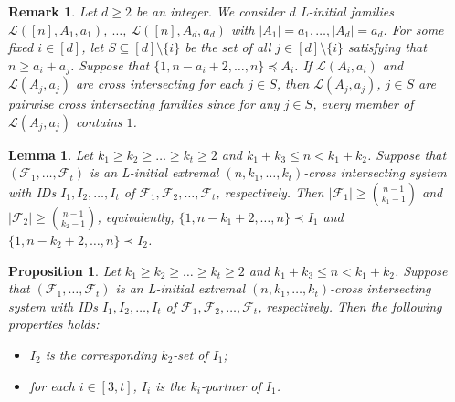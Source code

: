 \documentclass[10pt,a4paper]{amsart}
\newtheorem{proposition}{Proposition}
\newtheorem{remark}{Remark}
\newtheorem{lemma}{Lemma}
\begin{document}
\begin{remark}\label{remark2.20+}
Let $d\geq 2$ be an integer. We consider $d$ L-initial families $\mathcal{L}([n], A_1, a_1)$, $\dots$, $\mathcal{L}([n], A_d, a_d)$ with $|A_1|=a_1, \dots, |A_d|=a_d$. For some fixed $i\in [d]$, let $S\subseteq [d]\setminus \{i\}$ be the set of all $j\in [d]\setminus \{i\}$ satisfying that $n\geq a_i+a_j$. Suppose that $\{1, n-a_i+2, \dots, n\}\preceq  A_i$. If $\mathcal{L}(A_i, a_i)$ and $\mathcal{L}(A_j, a_j)$ are cross intersecting for each $j\in S$, then
$\mathcal{L}(A_j, a_j)$, $j\in S$ are pairwise cross intersecting families since for any $j\in S$, every member of $\mathcal{L}(A_j, a_j)$ contains $1$.
\end{remark}

\begin{lemma}\label{>}
Let $k_1\geq k_2\geq\dots\geq k_t\geq 2$ and $k_1+k_3\leq n <k_1+k_2$.
Suppose that $(\mathcal{F}_1, \dots, \mathcal{F}_t)$ is an L-initial extremal $(n, k_1, \dots, k_t)$-cross intersecting system with IDs $I_1, I_2, \dots, I_t$  of $\mathcal{F}_1, \mathcal{F}_2, \dots, \mathcal{F}_t$, respectively. Then
 $|\mathcal{F}_1|\geq {n-1\choose k_1-1}$ and $|\mathcal{F}_2|\geq {n-1\choose k_2-1}$, equivalently, $\{1, n-k_1+2, \dots, n\} \prec I_1$ and $\{1, n-k_2+2, \dots, n\} \prec I_2$.
\end{lemma}

\begin{proposition}\label{7-18-1}
Let $k_1\geq k_2\geq\dots\geq k_t\geq 2$ and $k_1+k_3\leq n <k_1+k_2$.
Suppose that $(\mathcal{F}_1, \dots, \mathcal{F}_t)$ is an L-initial extremal $(n, k_1, \dots, k_t)$-cross intersecting system with  IDs $I_1, I_2, \dots, I_t$  of $\mathcal{F}_1, \mathcal{F}_2, \dots, \mathcal{F}_t$, respectively. Then the following properties holds:
\begin{itemize}
\item[(i)] $I_2$ is the corresponding $k_2$-set of $I_1$;
\item[(ii)] for each $i\in [3, t]$, $I_i$ is the $k_i$-partner of $I_1$.
\end{itemize}
\end{proposition}
\end{document}
